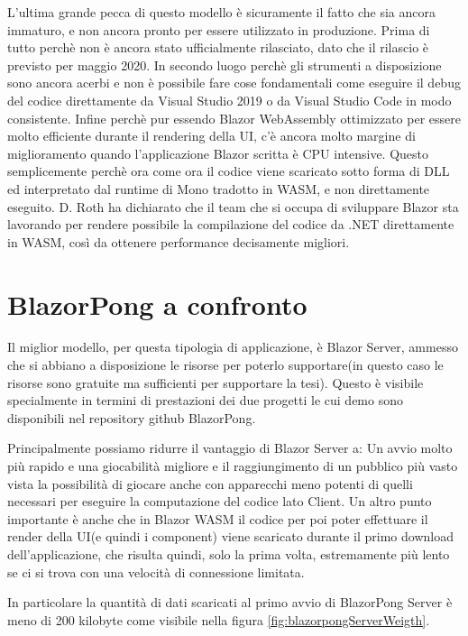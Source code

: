 L'ultima grande pecca di questo modello \`e sicuramente il fatto che sia ancora immaturo, e non ancora pronto per essere utilizzato in produzione.
Prima di tutto perch\`e non \`e ancora stato ufficialmente rilasciato, dato che il rilascio \`e previsto per maggio 2020.
In secondo luogo perch\`e gli strumenti a disposizione sono ancora acerbi e non \`e possibile fare cose fondamentali come eseguire il debug del codice direttamente da Visual Studio 2019 o da Visual Studio Code in modo consistente.
Infine perch\`e pur essendo Blazor WebAssembly ottimizzato per essere molto efficiente durante il rendering della UI, c'\`e ancora molto margine di miglioramento quando l'applicazione Blazor scritta \`e CPU intensive.
Questo semplicemente perch\`e ora come ora il codice viene scaricato sotto forma di DLL ed interpretato dal runtime di Mono tradotto in WASM, e non direttamente eseguito.
D. Roth ha dichiarato che il team che si occupa di sviluppare Blazor sta lavorando per rendere possibile la compilazione del codice da .NET direttamente in WASM, cos\`i da ottenere performance decisamente migliori\cite{blazorModelsScenarios}.

\section{BlazorPong a confronto}\label{sez:scalabilitaBWA}
Il miglior modello, per questa tipologia di applicazione, \`e Blazor Server, ammesso che si abbiano a disposizione le risorse per poterlo supportare(in questo caso le risorse sono gratuite ma sufficienti per supportare la tesi).
Questo \`e visibile specialmente in termini di prestazioni dei due progetti le cui demo sono disponibili nel repository github BlazorPong.

Principalmente possiamo ridurre il vantaggio di Blazor Server a:
Un avvio molto pi\`u rapido e una giocabilit\`a migliore e il raggiungimento di un pubblico pi\`u vasto vista la possibilit\`a di giocare anche con apparecchi meno potenti di quelli necessari per eseguire la computazione del codice lato Client.
Un altro punto importante \`e anche che in Blazor WASM il codice per poi poter effettuare il render della UI(e quindi i component) viene scaricato durante il primo download dell'applicazione, che risulta quindi, solo la prima volta, estremamente pi\`u lento se ci si trova con una velocità di connessione limitata.

In particolare la quantit\`a di dati scaricati al primo avvio di BlazorPong Server \`e meno di 200 kilobyte come visibile nella figura \ref{fig:blazorpongServerWeigth}.

